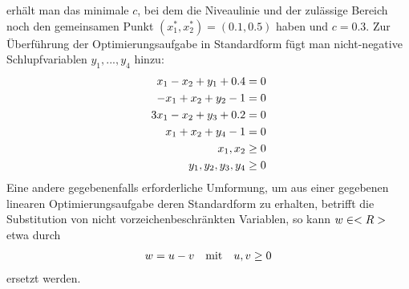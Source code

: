 \begin{example}
\begin{center}
	\end{center}
	erhält man das minimale $c$, bei dem die Niveaulinie und der zulässige Bereich noch den gemeinsamen Punkt $(x_1^\ast,x_2^\ast)=(0.1,0.5)$ haben und $c=0.3$. Zur Überführung der Optimierungsaufgabe in Standardform fügt man nicht-negative Schlupfvariablen $y_1,...,y_4$ hinzu:
	\begin{align}
		x_1-x_2+y_1+0.4 &= 0 \notag \\
		-x_1+x_2+y_2-1 &= 0 \notag \\
		3x_1-x_2+y_3+0.2 &= 0\notag \\
		x_1+x_2+y_4-1 &= 0\notag \\
		x_1,x_2 &\ge 0\notag \\
		y_1,y_2,y_3,y_4 &\ge 0 \notag
	\end{align}
	Eine andere gegebenenfalls erforderliche Umformung, um aus einer gegebenen linearen Optimierungsaufgabe deren Standardform zu erhalten, betrifft die Substitution von nicht vorzeichenbeschränkten Variablen, so kann $w\in<R>$ etwa durch
	\begin{align}
		w = u-v\quad\text{mit}\quad u,v\ge 0\notag
	\end{align}
	ersetzt werden.
\end{example}
